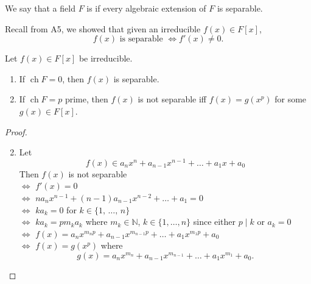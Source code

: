\documentclass[notoc,notitlepage]{tufte-book}
\DeclareMathOperator{\ch}{ch}
\begin{document}
\begin{defn}\label{defn:perfect_fields}
  We say that a field $F$ is  if every algebraic extension of
  $F$ is separable.
\end{defn}

\begin{note}
  Recall from A5, we showed that given an irreducible $f(x) \in F[x]$,
  \begin{equation*}
    f(x) \text{ is separable } \iff f'(x) \neq 0.
  \end{equation*}
\end{note}

\begin{propo}\label{propo:separability_and_the_characteristic_of_a_field}
  Let $f(x) \in F[x]$ be irreducible.
  \begin{enumerate}
    \item If $\ch F = 0$, then $f(x)$ is separable. 
    \item If $\ch F = p$ prime, then $f(x)$ is not separable iff $f(x) = g(x^p)$
      for some $g(x) \in F[x]$.
  \end{enumerate}
\end{propo}

\begin{proof}
  \begin{enumerate}
    \setcounter{enumi}{1}
    \item Let
      \begin{equation*}
        f(x) \in a_n x^n + a_{n - 1} x^{n - 1} + \hdots + a_1 x + a_0
      \end{equation*}
      Then $f(x)$ is not separable \\
      $\iff$ $f'(x) = 0$ \\
      $\iff$ $na_n x^{n - 1} + (n - 1)a_{n - 1} x^{n - 2} + \hdots + a_1 = 0$
        \\
      $\iff$ $ka_k = 0$ for $k \in \{ 1, \, \ldots, \, n \}$ \\
      $\iff$ $ka_k = pm_k a_k$ where $m_k \in \mathbb{N}$, $k \in \{ 1, \ldots,
        n \}$ since either $p \mid k$ or $a_k = 0$ \\
      $\iff$ $f(x) = a_n x^{m_n p} + a_{n - 1}x^{m_{n - 1} p} + \hdots + a_1
        x^{m_1 p} + a_0$ \\
      $\iff$ $f(x) = g(x^p)$ where
      \begin{equation*}
        g(x) = a_n x^{m_n} + a_{n - 1} x^{m_{n - 1}} + \hdots + a_1 x^{m_1} +
        a_0.
      \end{equation*}
  \end{enumerate}
\end{proof}
\end{document}
